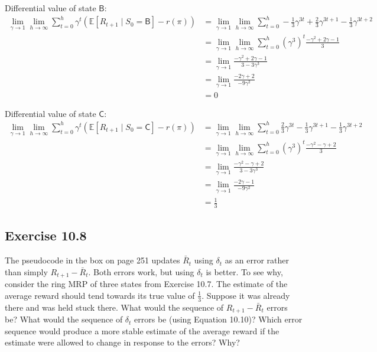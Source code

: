 Differential value of state $\mathsf{B}$:
\begin{align*}
    \lim_{\gamma \rightarrow 1} \lim_{h \rightarrow \infty} \sum_{t=0}^{h} \gamma^t \left( \mathbb{E} \left[ R_{t+1} \mid S_0 = \mathsf{B} \right] - r(\pi) \right) &=  \lim_{\gamma \rightarrow 1} \lim_{h \rightarrow \infty} \sum_{t=0}^{h} -\frac{1}{3} \gamma^{3t} +\frac{2}{3} \gamma^{3t+1}  - \frac{1}{3} \gamma^{3t+2} \\
    &= \lim_{\gamma \rightarrow 1} \lim_{h \rightarrow \infty} \sum_{t=0}^{h} (\gamma^3)^t \frac{-\gamma^2 + 2\gamma - 1}{3} \\
    &= \lim_{\gamma \rightarrow 1} \frac{-\gamma^2 + 2\gamma - 1}{3 - 3\gamma^3} \\
    &= \lim_{\gamma \rightarrow 1} \frac{-2\gamma + 2}{-9\gamma^2} \\
    &= 0
\end{align*}

Differential value of state $\mathsf{C}$:
\begin{align*}
    \lim_{\gamma \rightarrow 1} \lim_{h \rightarrow \infty} \sum_{t=0}^{h} \gamma^t \left( \mathbb{E} \left[ R_{t+1} \mid S_0 = \mathsf{C} \right] - r(\pi) \right) &=  \lim_{\gamma \rightarrow 1} \lim_{h \rightarrow \infty} \sum_{t=0}^{h} \frac{2}{3} \gamma^{3t} -\frac{1}{3} \gamma^{3t+1}  - \frac{1}{3} \gamma^{3t+2} \\
    &= \lim_{\gamma \rightarrow 1} \lim_{h \rightarrow \infty} \sum_{t=0}^{h} (\gamma^3)^t \frac{-\gamma^2 - \gamma + 2}{3} \\
    &= \lim_{\gamma \rightarrow 1} \frac{-\gamma^2 -\gamma + 2}{3 - 3\gamma^3} \\
    &= \lim_{\gamma \rightarrow 1} \frac{-2\gamma - 1}{-9\gamma^2} \\
    &= \frac{1}{3}
\end{align*}

\subsection*{Exercise 10.8}

The pseudocode in the box on page 251 updates $\bar{R}_t$ using  $\delta_t$ as an error
rather than simply $R_{t+1} - \bar{R}_t$. Both errors work, but using $\delta_t$ is better. To see why,
consider the ring MRP of three states from Exercise 10.7. The estimate of the average
reward should tend towards its true value of $\frac{1}{3}$. Suppose it was already there and was
held stuck there. What would the sequence of $R_{t+1} - \bar{R}_t$ errors be? What would the
sequence of $\delta_t$ errors be (using Equation 10.10)? Which error sequence would produce
a more stable estimate of the average reward if the estimate were allowed to change in
response to the errors? Why?

